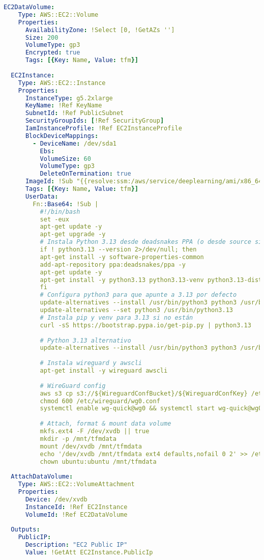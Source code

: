 \begin{lstlisting}[language=yaml, caption={Plantilla CloudFormation utilizada para el despliegue de entorno de entrenamiento}, label={lst:template_yaml}]
  EC2DataVolume:
    Type: AWS::EC2::Volume
    Properties:
      AvailabilityZone: !Select [0, !GetAZs '']
      Size: 200
      VolumeType: gp3
      Encrypted: true
      Tags: [{Key: Name, Value: tfm}]
  
  EC2Instance:
    Type: AWS::EC2::Instance
    Properties:
      InstanceType: g5.2xlarge
      KeyName: !Ref KeyName
      SubnetId: !Ref PublicSubnet
      SecurityGroupIds: [!Ref SecurityGroup]
      IamInstanceProfile: !Ref EC2InstanceProfile
      BlockDeviceMappings:
        - DeviceName: /dev/sda1
          Ebs:
          VolumeSize: 60
          VolumeType: gp3
          DeleteOnTermination: true
      ImageId: !Sub "{{resolve:ssm:/aws/service/deeplearning/ami/x86_64/base-oss-nvidia-driver-gpu-ubuntu-24.04/latest/ami-id}}"
      Tags: [{Key: Name, Value: tfm}]
      UserData:
        Fn::Base64: !Sub |
          #!/bin/bash
          set -eux
          apt-get update -y
          apt-get upgrade -y
          # Instala Python 3.13 desde deadsnakes PPA (o desde source si necesario)
          if ! python3.13 --version 2>/dev/null; then
          apt-get install -y software-properties-common
          add-apt-repository ppa:deadsnakes/ppa -y
          apt-get update -y
          apt-get install -y python3.13 python3.13-venv python3.13-distutils
          fi
          # Configura python3 para que apunte a 3.13 por defecto
          update-alternatives --install /usr/bin/python3 python3 /usr/bin/python3.13 2
          update-alternatives --set python3 /usr/bin/python3.13
          # Instala pip y venv para 3.13 si no están
          curl -sS https://bootstrap.pypa.io/get-pip.py | python3.13
          
          # Python 3.13 alternativo
          update-alternatives --install /usr/bin/python3 python3 /usr/bin/python3.13 2
          
          # Instala wireguard y awscli
          apt-get install -y wireguard awscli
          
          # WireGuard config
          aws s3 cp s3://${WireguardConfBucket}/${WireguardConfKey} /etc/wireguard/wg0.conf
          chmod 600 /etc/wireguard/wg0.conf
          systemctl enable wg-quick@wg0 && systemctl start wg-quick@wg0
          
          # Attach, format & mount data volume
          mkfs.ext4 -F /dev/xvdb || true
          mkdir -p /mnt/tfmdata
          mount /dev/xvdb /mnt/tfmdata
          echo '/dev/xvdb /mnt/tfmdata ext4 defaults,nofail 0 2' >> /etc/fstab
          chown ubuntu:ubuntu /mnt/tfmdata
  
  AttachDataVolume:
    Type: AWS::EC2::VolumeAttachment
    Properties:
      Device: /dev/xvdb
      InstanceId: !Ref EC2Instance
      VolumeId: !Ref EC2DataVolume
  
  Outputs:
    PublicIP:
      Description: "EC2 Public IP"
      Value: !GetAtt EC2Instance.PublicIp
\end{lstlisting}